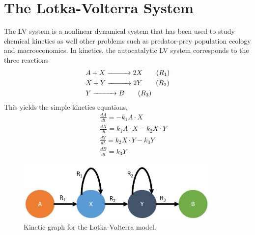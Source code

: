 \section{The Lotka-Volterra System}
\label{ch4:sec:lv}
The LV system is a nonlinear dynamical system that has been used to study
chemical kinetics\cite{ch4_31_lotka1910contribution} as well other problems such as predator-prey population ecology\cite{ch4_32_volterra1928variations} and macroeconomics.\cite{ch4_33_feinstein1975socialism} In kinetics,
the autocatalytic LV system corresponds to the three reactions
\begin{align*}
    & A + X \xrightarrow[]{\makebox[1cm]{}} 2X	\tag{$R_1$} \label{ch4:lv:rxn1}\\
    & X + Y \xrightarrow[]{\makebox[1cm]{}} 2Y		\tag{$R_2$} \label{ch4:lv:rxn2}\\
    & Y \xrightarrow[]{\makebox[1cm]{}} B				\tag{$R_3$} \label{ch4:lv:rxn3}
\end{align*}
This yields the simple kinetics equations,
\begin{eqnarray}
    && \frac{dA}{dt} = -k_1 A \cdot X			\label{ch4:eqn18} \\
    && \frac{dX}{dt} = k_1 A \cdot X - k_2 X \cdot Y	\label{ch4:eqn19} \\
    && \frac{dY}{dt} = k_2 X \cdot Y - k_3 Y		\label{ch4:eqn20} \\
    && \frac{dB}{dt} = k_3 Y				\label{ch4:eqn21}
\end{eqnarray}
\begin{figure}[htbp]
	\caption[Kinetic graph for the Lotka-Volterra model]{Kinetic graph for the Lotka-Volterra model.}
    \begin{center}
	\includegraphics[width=100mm]{figs/chapter4/fig2.jpg}
    \end{center}
\label{ch4:fig:2}
\end{figure}

